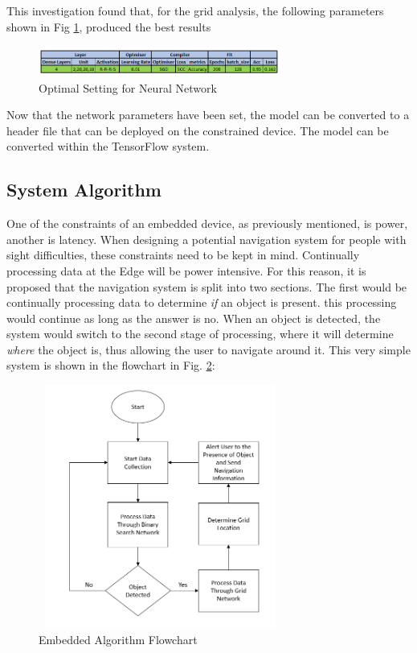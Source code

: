 \documentclass{svproc}
\begin{document}
This investigation found that, for the grid analysis, the following parameters shown in Fig \ref{fig:nn_settings}, produced the best results

\begin{figure}[ht]
\includegraphics[width=8cm, height=1cm]{images/nn_settings.png}
\centering
\caption{Optimal Setting for Neural Network}
\label{fig:nn_settings}
\end{figure}

Now that the network parameters have been set, the model can be converted to a header file that can be deployed on the constrained device. 
The model can be converted within the TensorFlow system.

\subsection{System Algorithm}
One of the constraints of an embedded device, as previously mentioned, is power, another is latency. When designing a potential navigation 
system for people with sight difficulties, these constraints need to be kept in mind. Continually processing data at the Edge will be power intensive. 
For this reason, it is proposed that the navigation system is split into two sections. The first would be continually processing data to 
determine \textit{if} an object is present. this processing would continue as long as the answer is no. When an object is detected, the system would 
switch to the second stage of processing, where it will determine \textit{where} the object is, thus allowing the user to navigate around it. This very 
simple system is shown in the flowchart in Fig. \ref{fig:embedded_algo_flowchart}:

\begin{figure}[ht]
\includegraphics[width=8cm, height=8cm]{images/embedded_algo_flowchart.png}
\centering
\caption{Embedded Algorithm Flowchart}
\label{fig:embedded_algo_flowchart}
\end{figure}
\end{document}
